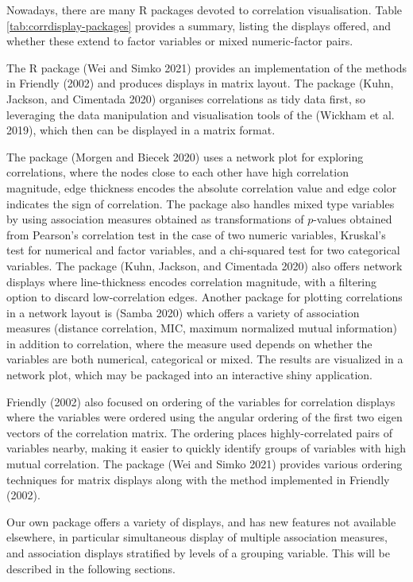 Nowadays, there are many R packages devoted to correlation visualisation. Table \ref{tab:corrdisplay-packages} provides a summary, listing the displays offered, and whether these extend to factor variables or mixed numeric-factor pairs.

The R package  (Wei and Simko 2021) provides an implementation of the methods in Friendly (2002) and produces displays in matrix layout. The package  (Kuhn, Jackson, and Cimentada 2020) organises correlations as tidy data first, so leveraging the data manipulation and visualisation tools of the  (Wickham et al. 2019), which then can be displayed in a matrix format.

The package  (Morgen and Biecek 2020) uses a network plot for exploring correlations, where the nodes close to each other have high correlation magnitude, edge thickness encodes the absolute correlation value and edge color indicates the sign of correlation. The package also handles mixed type variables by using association measures obtained as transformations of \(p\)-values obtained from
Pearson's correlation test in the case of two numeric variables, Kruskal's test for numerical and factor variables, and a chi-squared test for two categorical variables. The package  (Kuhn, Jackson, and Cimentada 2020) also offers network displays where line-thickness encodes correlation magnitude, with a filtering option to discard low-correlation edges. Another package for plotting correlations in a network layout is  (Samba 2020) which offers a variety of association measures (distance correlation, MIC, maximum normalized mutual information) in addition to correlation, where the measure used depends on whether the variables are both numerical, categorical or mixed. The results are visualized in a network plot, which may be packaged into an interactive shiny application.

Friendly (2002) also focused on ordering of the variables for correlation displays where the variables were ordered using the angular ordering of the first two eigen vectors of the correlation matrix. The ordering places highly-correlated pairs of variables nearby, making it easier to quickly identify groups of variables with high mutual correlation. The package  (Wei and Simko 2021) provides various ordering techniques for matrix displays along with the method implemented in Friendly (2002).

Our own package  offers a variety of displays, and has new features not available elsewhere, in particular simultaneous display of multiple association measures, and association displays stratified by levels of a grouping variable. This will be described in the following sections.

